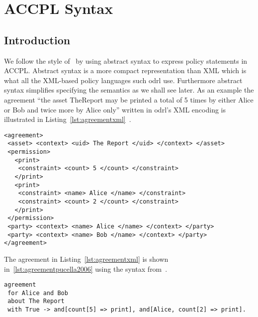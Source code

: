 \chapter{ACCPL Syntax}
\label{chap:odrl0syntax}

\section{Introduction}

We follow the style of~\cite{pucella2006} by using abstract syntax to express policy statements in \ac{ACCPL}. Abstract syntax is a more compact representation than XML which is what all the XML-based policy languages such \ac{odrl} use. Furthermore abstract syntax simplifies specifying the semantics as we shall see later. As an example the agreement ``the asset TheReport may be printed a total of 5 times by either Alice or Bob and twice more by Alice only'' written in \ac{odrl}'s XML encoding is illustrated in Listing~\ref{lst:agreementxml}~\cite{pucella2006}. 


\lstset{language=XML}
\begin{lstlisting}[caption={Agreement for Alice and Bob in XML},label={lst:agreementxml}]
<agreement>
 <asset> <context> <uid> The Report </uid> </context> </asset>
 <permission>
   <print>
    <constraint> <count> 5 </count> </constraint>
   </print>
   <print>
    <constraint> <name> Alice </name> </constraint>
    <constraint> <count> 2 </count> </constraint>
   </print>
 </permission>
 <party> <context> <name> Alice </name> </context> </party>
 <party> <context> <name> Bob </name> </context> </party>
</agreement>
\end{lstlisting}

The agreement in Listing~\ref{lst:agreementxml} is shown in~\ref{lst:agreementpucella2006} using the syntax from~\cite{pucella2006}.

\lstset{language=Pucella2006}
\begin{lstlisting}[frame=single, caption={Agreement for Alice and Bob as BNF (as used in~\cite{pucella2006})},label={lst:agreementpucella2006}]
agreement
 for Alice and Bob 
 about The Report 
 with True -> and[count[5] => print], and[Alice, count[2] => print].
\end{lstlisting}


